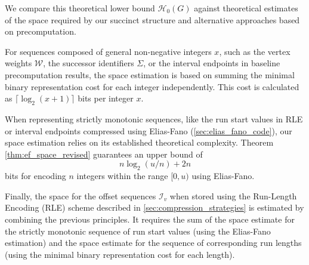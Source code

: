 We compare this theoretical lower bound $\mathcal{H}_0(G)$ against theoretical estimates of the space required by our succinct structure and alternative approaches based on precomputation.

For sequences composed of general non-negative integers $x$, such as the vertex weights $\mathcal{W}$, the successor identifiers $\Sigma$, or the interval endpoints in baseline precomputation results, the space estimation is based on summing the minimal binary representation cost for each integer independently. This cost is calculated as $\lceil \log_2(x+1) \rceil$ bits per integer $x$.

When representing strictly monotonic sequences, like the run start values in RLE or interval endpoints compressed using Elias-Fano (\autoref{sec:elias_fano_code}), our space estimation relies on its established theoretical complexity. Theorem \ref{thm:ef_space_revised} guarantees an upper bound of
\[n \log_2(u/n) + 2n\]
bits for encoding $n$ integers within the range $[0, u)$ using Elias-Fano.

Finally, the space for the offset sequences $\mathcal{I}_v$ when stored using the Run-Length Encoding (RLE) scheme described in \autoref{sec:compression_strategies} is estimated by combining the previous principles. It requires the sum of the space estimate for the strictly monotonic sequence of run start values (using the Elias-Fano estimation) and the space estimate for the sequence of corresponding run lengths (using the minimal binary representation cost for each length).

